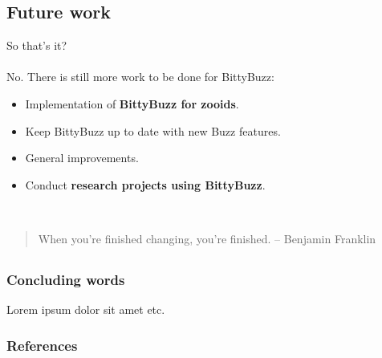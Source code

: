 \documentclass{beamer}
\begin{document}
	\begin{frame}
		\section{Future work}
		So that's it?\\
		~\\
		No. There is still more work to be done for BittyBuzz:
		\begin{itemize}
			\item Implementation of \textbf{BittyBuzz for zooids}.
			\item Keep BittyBuzz up to date with new Buzz features.
			\item General improvements.
			\item Conduct \textbf{research projects using BittyBuzz}.
		\end{itemize}
		~\\
		\begin{quote}
			When you're finished changing, you're finished. -- Benjamin Franklin
		\end{quote}
	\end{frame}
	\begin{frame}
		\section{}
		\frametitle{Concluding words}
		Lorem ipsum dolor sit amet etc.
	\end{frame}
	\begin{frame}[allowframebreaks]
		\frametitle{References}
		
		
	\end{frame}
\end{document}
